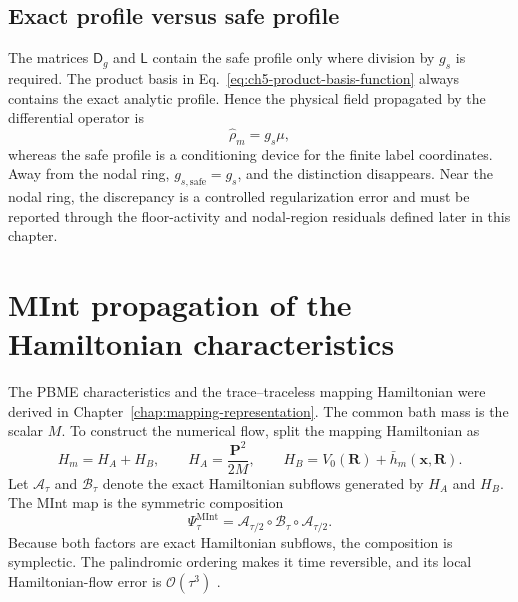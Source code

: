 \documentclass[
  11pt,
  letterpaper,
  onehalfspacing,
  normalmargins,
  equalmargins,
  oneside
]{ut-thesis}
\begin{document}
\subsection{Exact profile versus safe profile}
\label{subsec:ch5-exact-safe-profile}

The matrices \(\mathsf D_g\) and \(\mathsf L\) contain the safe profile only where division by
\(g_s\) is required. The product basis in
Eq.~\eqref{eq:ch5-product-basis-function} always contains the exact analytic
profile. Hence the physical field propagated by the differential operator is
\begin{equation}
\widehat{\rho}_m
=
 g_s\mu,
\label{eq:ch5-exact-field-reminder}
\end{equation}
whereas the safe profile is a conditioning device for the finite label
coordinates. Away from the nodal ring, \(g_{s,\mathrm{safe}}=g_s\), and the
distinction disappears. Near the nodal ring, the discrepancy is a controlled
regularization error and must be reported through the floor-activity and
nodal-region residuals defined later in this chapter.


\section{MInt propagation of the Hamiltonian characteristics}
\label{sec:ch5-mint-propagation}

The PBME characteristics and the trace--traceless mapping Hamiltonian were
derived in Chapter~\ref{chap:mapping-representation}. The common bath mass is
the scalar \(M\). To construct the numerical flow, split the mapping
Hamiltonian as
\begin{equation}
H_m
=
H_A+H_B,
\qquad
H_A
=
\frac{\mathbf P^2}{2M},
\qquad
H_B
=
V_0(\mathbf R)+\bar h_m(\mathbf x,\mathbf R).
\label{eq:ch5-mint-split}
\end{equation}
Let \(\mathcal A_\tau\) and \(\mathcal B_\tau\) denote the exact Hamiltonian
subflows generated by \(H_A\) and \(H_B\). The MInt map is the symmetric
composition
\begin{equation}
\Psi_\tau^{\mathrm{MInt}}
=
\mathcal A_{\tau/2}
\circ
\mathcal B_\tau
\circ
\mathcal A_{\tau/2}.
\label{eq:ch5-mint-composition}
\end{equation}
Because both factors are exact Hamiltonian subflows, the composition is
symplectic. The palindromic ordering makes it time reversible, and its local
Hamiltonian-flow error is \(\mathcal O(\tau^3)\)
\cite{Strang1968,Church2018JCP}.
\end{document}
